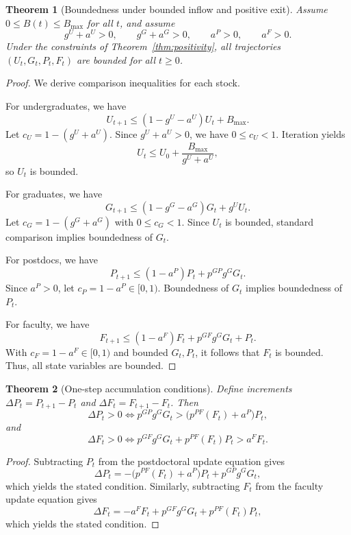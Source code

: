 \documentclass[3p]{elsarticle}%
\newtheorem{theorem}{Theorem}
\theoremstyle{definition}
\begin{document}
\begin{theorem}[Boundedness under bounded inflow and positive exit]\label{thm:boundedness}
Assume \(0\leq B(t)\leq B_{\max}\) for all \(t\), and assume
\[
g^U+a^U>0,\qquad g^G+a^G>0,\qquad a^P>0,\qquad a^F>0.
\]
Under the constraints of Theorem~\ref{thm:positivity}, all trajectories \((U_t,G_t,P_t,F_t)\) are bounded for all \(t\geq 0\).
\end{theorem}

\begin{proof}
We derive comparison inequalities for each stock.

\noindent For undergraduates, we have
\[
U_{t+1} \leq (1-g^U-a^U)U_t + B_{\max}.
\]
Let \(c_U = 1-(g^U+a^U)\). Since \(g^U+a^U>0\), we have \(0\leq c_U<1\). Iteration yields
\[
U_t \leq U_0 + \frac{B_{\max}}{g^U+a^U},
\]
so \(U_t\) is bounded.

\noindent For graduates, we have
\[
G_{t+1} \leq (1-g^G-a^G)G_t + g^U U_t.
\]
Let \(c_G=1-(g^G+a^G)\) with \(0\leq c_G<1\). Since \(U_t\) is bounded, standard comparison implies boundedness of \(G_t\).

\noindent For postdocs, we have
\[
P_{t+1} \leq (1-a^P)P_t + p^{GP}g^G G_t.
\]
Since \(a^P>0\), let \(c_P=1-a^P\in[0,1)\). Boundedness of \(G_t\) implies boundedness of \(P_t\).

\noindent For faculty, we have
\[
F_{t+1} \leq (1-a^F)F_t + p^{GF}g^G G_t + P_t.
\]
With \(c_F=1-a^F\in[0,1)\) and bounded \(G_t,P_t\), it follows that \(F_t\) is bounded. Thus, all state variables are bounded.
\end{proof}

\begin{theorem}[One-step accumulation conditions]\label{thm:accumulation}
Define increments \(\Delta P_t=P_{t+1}-P_t\) and \(\Delta F_t=F_{t+1}-F_t\). Then
\[
\Delta P_t>0 \iff p^{GP}g^G G_t > \bigl(p^{PF}(F_t)+a^P\bigr)P_t,
\]
and
\[
\Delta F_t>0 \iff p^{GF}g^G G_t + p^{PF}(F_t)P_t > a^F F_t.
\]
\end{theorem}

\begin{proof}
Subtracting \(P_t\) from the postdoctoral update equation gives
\[
\Delta P_t = -\bigl(p^{PF}(F_t)+a^P\bigr)P_t + p^{GP}g^G G_t,
\]
which yields the stated condition.  
Similarly, subtracting \(F_t\) from the faculty update equation gives
\[
\Delta F_t = -a^F F_t + p^{GF}g^G G_t + p^{PF}(F_t)P_t,
\]
which yields the stated condition.
\end{proof}
\end{document}
